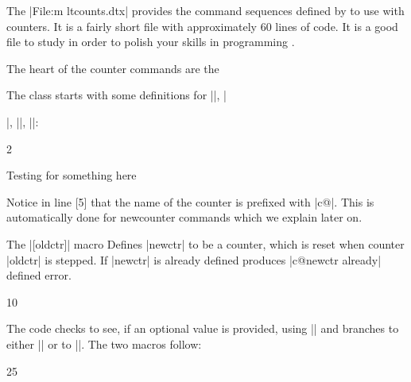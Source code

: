 \begin{multicols}{2}
The |File:m ltcounts.dtx| provides the command sequences defined by \latex to use with counters. It is a fairly short file with approximately 
60 lines of code. It is a good file to study in order to polish your skills in programming \tex. 

The heart of the counter commands are the 

The class starts with some definitions for |\setcounter|, |\addtocounter|, |\newcounter|, |\value|:


\begin{Code}
2 \def\setcounter#1#2{%
3   \@ifundefined{c@#1}%
4      {\@nocounterr{#1}}%
5      {\global\csname c@#1\endcsname#2\relax}}
\end{Code}


Testing for something here

Notice in line [5] that the name of the counter is prefixed with |c@|. This is automatically done for newcounter commands which we explain later on.


The |[oldctr]| macro  Defines |newctr| to be a counter, which is
reset when counter |oldctr|  is stepped. If |newctr| is  already defined produces
|c@newctr already| defined  error.

\begin{Code}
10 \def\newcounter#1{%
11 \expandafter\@ifdefinable \csname c@#1\endcsname
12 {\@definecounter{#1}}%
13 \@ifnextchar[{\@newctr{#1}}{}}
\end{Code}

The code checks to see, if an optional value is provided, using |\@ifnextchar| and branches to either
|\@definecounter| or to |\@newctr|. The two macros follow:



\begin{Code}
25 \def\@definecounter#1{\expandafter\newcount\csname c@#1\endcsname
26 \setcounter{#1}\z@
27 \global\expandafter\let\csname cl@#1\endcsname\@empty
28 \@addtoreset{#1}{@ckpt}%
29 \global\expandafter\let\csname p@#1\endcsname\@empty
30 \expandafter
31 \gdef\csname the#1\expandafter\endcsname\expandafter
32 {\expandafter\@arabic\csname c@#1\endcsname}}
\end{Code}


\end{multicols}
